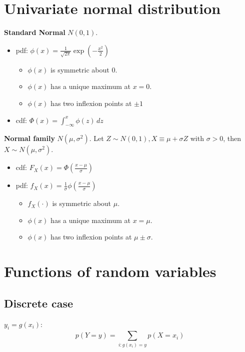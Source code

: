 \section{Univariate normal distribution}

\begin{definition}
    \textbf{Standard Normal} $N(0,1)$. \begin{itemize}
        \item pdf: $\phi (x) = \frac{1}{\sqrt{2 \pi }} \exp(-\frac{x ^{2}}{2})$ \begin{itemize}
                  \item $\phi (x) $ is symmetric about $0$.
                  \item $\phi (x) $ has a unique maximum at $x = 0$.
                  \item $\phi (x)$ has two inflexion points at $\pm 1$
              \end{itemize}
        \item cdf: $\Phi(x) = \int_{-\infty }^{x} \phi (z) \, dz$
    \end{itemize}
\end{definition}

\begin{definition}
    \textbf{Normal family} $N(\mu, \sigma^2)$. Let $Z \sim N(0,1), X \equiv \mu + \sigma Z$ with $\sigma > 0$, then $X \sim N(\mu, \sigma^2)$. \begin{itemize}
        \item cdf: $F_X(x) = \Phi(\frac{x-\mu}{\sigma})$
        \item pdf: $f_X(x) = \frac{1}{\sigma}\phi(\frac{x-\mu}{\sigma})$ \begin{itemize}
                  \item $f_X(\cdot )$ is symmetric about $\mu$.
                  \item $\phi (x) $ has a unique maximum at $x = \mu$.
                  \item $\phi (x)$ has two inflexion points at $\mu \pm \sigma$.
              \end{itemize}
    \end{itemize}
\end{definition}


\section{Functions of random variables}

\subsection{Discrete case} $y_i= g(x_i)$:
\[
    p(Y=y) = \sum_{i: g(x_i)=y}^{} p(X=x_i)
\]

